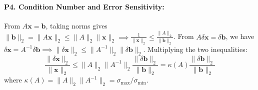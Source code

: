 \paragraph{P4. Condition Number and Error Sensitivity:}
From $A\mathbf{x} = \mathbf{b}$, taking norms gives $\|\mathbf{b}\|_2 = \|A\mathbf{x}\|_2 \le \|A\|_2 \|\mathbf{x}\|_2 \implies \frac{1}{\|\mathbf{x}\|_2} \le \frac{\|A\|_2}{\|\mathbf{b}\|_2}$.
From $A \delta \mathbf{x} = \delta \mathbf{b}$, we have $\delta \mathbf{x} = A^{-1} \delta \mathbf{b} \implies \|\delta \mathbf{x}\|_2 \le \|A^{-1}\|_2 \|\delta \mathbf{b}\|_2$.
Multiplying the two inequalities:
\begin{equation*}
\frac{\|\delta \mathbf{x}\|_2}{\|\mathbf{x}\|_2} \le \|A\|_2 \|A^{-1}\|_2 \frac{\|\delta \mathbf{b}\|_2}{\|\mathbf{b}\|_2} = \kappa(A) \frac{\|\delta \mathbf{b}\|_2}{\|\mathbf{b}\|_2}
\end{equation*}
where $\kappa(A) = \|A\|_2 \|A^{-1}\|_2 = \sigma_{\max} / \sigma_{\min}$.

